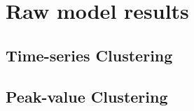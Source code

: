 \section{Raw model results}

\subsection{Time-series Clustering}

 
 
 

\subsection{Peak-value Clustering}


